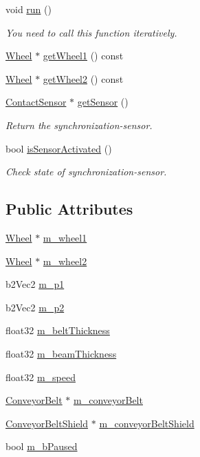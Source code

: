 \begin{DoxyCompactItemize}
void \hyperlink{classConveyor_a37bd6265284a18cc7dd5247f2367b485}{run} ()
\begin{DoxyCompactList}\small\item\em You need to call this function iteratively. \end{DoxyCompactList}\item 
\hyperlink{classWheel}{Wheel} $\ast$ \hyperlink{classConveyor_ae742b2ae2f99c1d3f467ba8718b822f2}{get\-Wheel1} () const 
\item 
\hyperlink{classWheel}{Wheel} $\ast$ \hyperlink{classConveyor_a04fcab5fd72b64c1d05db0a8b1dfc597}{get\-Wheel2} () const 
\item 
\hyperlink{classContactSensor}{Contact\-Sensor} $\ast$ \hyperlink{classConveyor_ac9402d02e1d79aa5faebcb229c45620a}{get\-Sensor} ()
\begin{DoxyCompactList}\small\item\em Return the synchronization-\/sensor. \end{DoxyCompactList}\item 
bool \hyperlink{classConveyor_a475ce9af7f0d6c108763728228e32b56}{is\-Sensor\-Activated} ()
\begin{DoxyCompactList}\small\item\em Check state of synchronization-\/sensor. \end{DoxyCompactList}\end{DoxyCompactItemize}
\subsection*{Public Attributes}
\begin{DoxyCompactItemize}
\item 
\hyperlink{classWheel}{Wheel} $\ast$ \hyperlink{classConveyor_add4c93f9cde9efd141ec813e429161b3}{m\-\_\-wheel1}
\item 
\hyperlink{classWheel}{Wheel} $\ast$ \hyperlink{classConveyor_a49272a7a68a6d1072c170fe4080c720b}{m\-\_\-wheel2}
\item 
b2\-Vec2 \hyperlink{classConveyor_a113c9d44089b1538f7c35e6888366904}{m\-\_\-p1}
\item 
b2\-Vec2 \hyperlink{classConveyor_aa1cd90bad95a21f56a56d8c468b366bf}{m\-\_\-p2}
\item 
float32 \hyperlink{classConveyor_a38e79e2c88efd24fd626485bff30f697}{m\-\_\-belt\-Thickness}
\item 
float32 \hyperlink{classConveyor_aa16886f74252de25d3d8972779f282b0}{m\-\_\-beam\-Thickness}
\item 
float32 \hyperlink{classConveyor_aada37ff91042927da34b025345c9350f}{m\-\_\-speed}
\item 
\hyperlink{classConveyorBelt}{Conveyor\-Belt} $\ast$ \hyperlink{classConveyor_aa1640f4a83793107fcb2af5915b3fba1}{m\-\_\-conveyor\-Belt}
\item 
\hyperlink{classConveyorBeltShield}{Conveyor\-Belt\-Shield} $\ast$ \hyperlink{classConveyor_acb82b369204df0d42ae4483f9e0c9374}{m\-\_\-conveyor\-Belt\-Shield}
\item 
bool \hyperlink{classConveyor_a5cf9db504e884a9542b52037e6e7eb4f}{m\-\_\-b\-Paused}
\end{DoxyCompactItemize}


